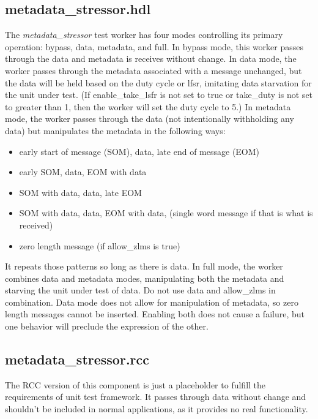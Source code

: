 \documentclass{article}
\def\comp{metadata\_stressor}
\begin{document}
\subsection*{\comp.hdl}
\begin{flushleft}
The \textit{\comp} test worker has four modes controlling its primary operation: bypass, data, metadata, and full. In bypass mode, this worker passes through the data and metadata is receives without change. In data mode, the worker passes through the metadata associated with a message unchanged, but the data will be held based on the duty cycle or lfsr, imitating data starvation for the unit under test. (If enable\_take\_lsfr is not set to true or take\_duty is not set to greater than 1, then the worker will set the duty cycle to 5.) In metadata mode, the worker passes through the data (not intentionally withholding any data) but manipulates the metadata in the following ways:
\begin{itemize}
 \item early start of message (SOM), data, late end of message (EOM)
 \item early SOM, data, EOM with data
 \item SOM with data, data, late EOM
 \item SOM with data, data, EOM with data, (single word message if that is what is received)
 \item zero length message (if allow\_zlms is true)
\end{itemize}
It repeats those patterns so long as there is data.
In full mode, the worker combines data and metadata modes, manipulating both the metadata and starving the unit under test of data.
Do not use data and allow\_zlms in combination. Data mode does not allow for manipulation of metadata, so zero length messages cannot be inserted. Enabling both does not cause a failure, but one behavior will preclude the expression of the other.  \medskip
\end{flushleft}

\subsection*{\comp.rcc}
\begin{flushleft}
The RCC version of this component is just a placeholder to fulfill the requirements of unit test framework. It passes through data without change and shouldn't be included in normal applications, as it provides no real functionality.  \medskip
\end{flushleft}
\end{document}
